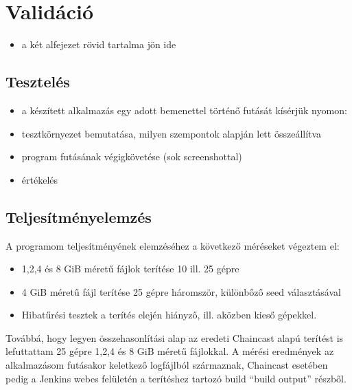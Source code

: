 \chapter{Validáció}
\label{chp:validation}
\begin{itemize}
  \item a két alfejezet rövid tartalma jön ide
\end{itemize}

\section{Tesztelés}
\begin{itemize}
  \item a készített alkalmazás egy adott bemenettel történő futását kísérjük nyomon:
  \item tesztkörnyezet bemutatása, milyen szempontok alapján lett összeállítva
  \item program futásának végigkövetése (sok screenshottal)
  \item értékelés
\end{itemize}

\section{Teljesítményelemzés}
A programom teljesítményének elemzéséhez a következő méréseket végeztem el:

\begin{itemize}
  \item 1,2,4 és 8 GiB méretű fájlok terítése 10 ill. 25 gépre
  \item 4 GiB méretű fájl terítése 25 gépre háromször, különbőző seed választásával
  \item Hibatűrési tesztek a terítés elején hiányző, ill. aközben kieső gépekkel.
\end{itemize}

Továbbá, hogy legyen összehasonlítási alap  az eredeti Chaincast alapú terítést is lefuttattam 25 gépre 1,2,4 és 8 GiB méretű fájlokkal.
A mérési eredmények az alkalmazásom futásakor keletkező logfájlból származnak, Chaincast esetében pedig a Jenkins webes felületén a terítéshez tartozó build ``build output'' részből.

